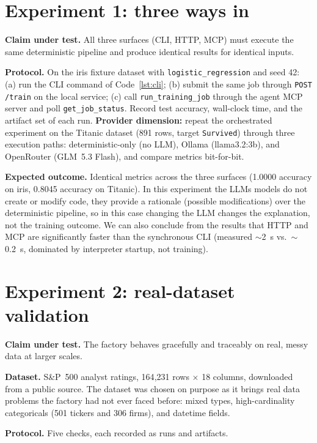 \section{Experiment 1: three ways in}
\label{sec:exp1}

\textbf{Claim under test.} All three surfaces (CLI, HTTP, MCP) must execute the same deterministic pipeline and produce identical results for identical inputs.

\textbf{Protocol.} On the iris fixture dataset with \texttt{logistic\_regression} and seed 42: (a) run the CLI command of Code~\ref{lst:cli}; (b) submit the same job through \texttt{POST /train} on the local service; (c) call \texttt{run\_training\_job} through the agent MCP server and poll \texttt{get\_job\_status}. Record test accuracy, wall-clock time, and the artifact set of each run. \textbf{Provider dimension:} repeat the orchestrated experiment on the Titanic dataset (891 rows, target \texttt{Survived}) through three execution paths: deterministic-only (no LLM), Ollama (llama3.2:3b), and OpenRouter (GLM~5.3 Flash), and compare metrics bit-for-bit.

\textbf{Expected outcome.} Identical metrics across the three surfaces (1.0000 accuracy on iris, 0.8045 accuracy on Titanic). In this experiment the LLMs models do not create or modify code, they provide a rationale (possible modifications) over the deterministic pipeline, so in this case changing the LLM changes the explanation, not the training outcome. We can also conclude from the results that HTTP and MCP are significantly faster than the synchronous CLI (measured $\sim$2~s vs.\ $\sim$0.2~s, dominated by interpreter startup, not training).


\section{Experiment 2: real-dataset validation}
\label{sec:exp2}

\textbf{Claim under test.} The factory behaves gracefully and traceably on
real, messy data at larger scales.

\textbf{Dataset.} S\&P~500 analyst ratings, 164{,}231 rows $\times$ 18
columns, downloaded from a public source. The dataset was chosen on purpose as
it brings real data problems the factory had not ever faced before: mixed types,
high-cardinality categoricals (501 tickers and 306 firms), and datetime
fields.

\textbf{Protocol.} Five checks, each recorded as runs and artifacts.

